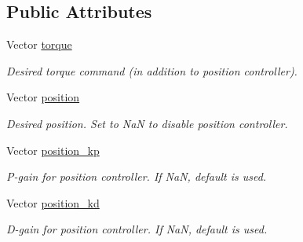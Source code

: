 \subsection*{Public Attributes}
\begin{DoxyCompactItemize}
\item 
Vector \hyperlink{structrobot__interfaces_1_1NJointRobotTypes_1_1Action_ad19a93b677bdc60e655071743acf160e}{torque}\hypertarget{structrobot__interfaces_1_1NJointRobotTypes_1_1Action_ad19a93b677bdc60e655071743acf160e}{}\label{structrobot__interfaces_1_1NJointRobotTypes_1_1Action_ad19a93b677bdc60e655071743acf160e}

\begin{DoxyCompactList}\small\item\em Desired torque command (in addition to position controller). \end{DoxyCompactList}\item 
Vector \hyperlink{structrobot__interfaces_1_1NJointRobotTypes_1_1Action_ad0d8104b1e521c7d0a316d093155e3a8}{position}\hypertarget{structrobot__interfaces_1_1NJointRobotTypes_1_1Action_ad0d8104b1e521c7d0a316d093155e3a8}{}\label{structrobot__interfaces_1_1NJointRobotTypes_1_1Action_ad0d8104b1e521c7d0a316d093155e3a8}

\begin{DoxyCompactList}\small\item\em Desired position. Set to NaN to disable position controller. \end{DoxyCompactList}\item 
Vector \hyperlink{structrobot__interfaces_1_1NJointRobotTypes_1_1Action_a16eb24df6bdbc10c8ce08c0621723b92}{position\+\_\+kp}\hypertarget{structrobot__interfaces_1_1NJointRobotTypes_1_1Action_a16eb24df6bdbc10c8ce08c0621723b92}{}\label{structrobot__interfaces_1_1NJointRobotTypes_1_1Action_a16eb24df6bdbc10c8ce08c0621723b92}

\begin{DoxyCompactList}\small\item\em P-\/gain for position controller. If NaN, default is used. \end{DoxyCompactList}\item 
Vector \hyperlink{structrobot__interfaces_1_1NJointRobotTypes_1_1Action_a3690aa864884fb51fb411d26eeea3fd4}{position\+\_\+kd}\hypertarget{structrobot__interfaces_1_1NJointRobotTypes_1_1Action_a3690aa864884fb51fb411d26eeea3fd4}{}\label{structrobot__interfaces_1_1NJointRobotTypes_1_1Action_a3690aa864884fb51fb411d26eeea3fd4}

\begin{DoxyCompactList}\small\item\em D-\/gain for position controller. If NaN, default is used. \end{DoxyCompactList}\end{DoxyCompactItemize}


